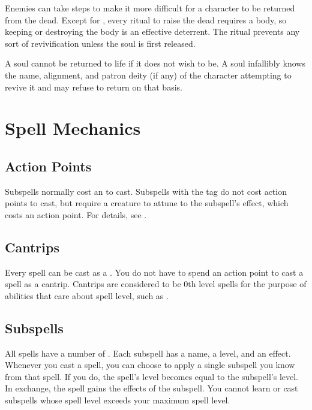         Enemies can take steps to make it more difficult for a character to be returned from the dead.
        Except for , every ritual to raise the dead requires a body, so keeping or destroying the body is an effective deterrent.
        The  ritual prevents any sort of revivification unless the soul is first released.

         A soul cannot be returned to life if it does not wish to be.
        A soul infallibly knows the name, alignment, and patron deity (if any) of the character attempting to revive it and may refuse to return on that basis.

\section{Spell Mechanics}\label{Spell Mechanics}

    \subsection{Action Points}
        Subspells normally cost an  to cast.
        Subspells with the  tag do not cost action points to cast, but require a creature to attune to the subspell's effect, which costs an action point.
        For details, see .

    \subsection{Cantrips}\label{Cantrips}
        Every spell can be cast as a .
        You do not have to spend an action point to cast a spell as a cantrip.
        Cantrips are considered to be 0th level spells for the purpose of abilities that care about spell level, such as .

    \subsection{Subspells}\label{Subspells}
        All spells have a number of .
        Each subspell has a name, a level, and an effect.
        Whenever you cast a spell, you can choose to apply a single subspell you know from that spell.
        If you do, the spell's level becomes equal to the subspell's level.
        In exchange, the spell gains the effects of the subspell.
        You cannot learn or cast subspells whose spell level exceeds your maximum spell level.

